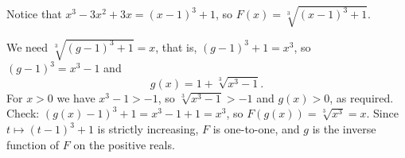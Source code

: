 Notice that $x^3-3x^2+3x=(x-1)^3+1$, so $F(x)=\sqrt[3]{(x-1)^3+1}$.

We need $\sqrt[3]{(g-1)^3+1}=x$, that is, $(g-1)^3+1=x^3$, so $(g-1)^3=x^3-1$ and
\[
g(x)=\boxed{1+\sqrt[3]{x^3-1}} .
\]
For $x>0$ we have $x^3-1>-1$, so $\sqrt[3]{x^3-1}>-1$ and $g(x)>0$, as required. Check: $\left(g(x)-1\right)^3+1=x^3-1+1=x^3$, so $F(g(x))=\sqrt[3]{x^3}=x$. Since $t\mapsto(t-1)^3+1$ is strictly increasing, $F$ is one-to-one, and $g$ is the inverse function of $F$ on the positive reals.

